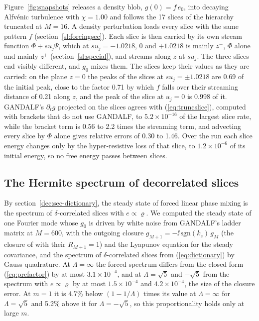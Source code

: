 Figure~\ref{fig:snapshots} releases a density blob, $g(0)=f\,e_0$, into decaying Alfv\'enic turbulence with $\chi=1.00$ and follows the 17 slices of the hierarchy truncated at $M=16$. A density perturbation loads every slice with the same pattern $f$ (section~\ref{sl:forcingsec}). Each slice is then carried by its own stream function $\Phi+su_j\Psi$, which at $su_j=-1.0218$, $0$ and $+1.0218$ is mainly $z^-$, $\Phi$ alone and mainly $z^+$ (section~\ref{sl:special}), and streams along $z$ at $su_j$. The three slices end visibly different, and $g_0$ mixes them. The slices keep their values as they are carried: on the plane $z=0$ the peaks of the slices at $su_j=\pm1.0218$ are 0.69 of the initial peak, close to the factor 0.71 by which $f$ falls over their streaming distance of 0.21 along $z$, and the peak of the slice at $u_j=0$ is 0.998 of it. GANDALF's $\partial_tg$ projected on the slices agrees with (\ref{eq:truncslice}), computed with brackets that do not use GANDALF, to $5.2\times10^{-16}$ of the largest slice rate, while the bracket term is 0.56 to 2.2 times the streaming term, and advecting every slice by $\Phi$ alone gives relative errors of 0.30 to 1.46. Over the run each slice energy changes only by the hyper-resistive loss of that slice, to $1.2\times10^{-6}$ of its initial energy, so no free energy passes between slices.

\subsection{The Hermite spectrum of decorrelated slices}\label{num:dictionary}

By section~\ref{dec:sec-dictionary}, the steady state of forced linear phase mixing is the spectrum of $\delta$-correlated slices with $e\propto\varrho$. We computed the steady state of one Fourier mode whose $g_0$ is driven by white noise from GANDALF's ladder matrix at $M=600$, with the outgoing closure $g_{M+1}=-\ii\,\mathrm{sgn}(k_z)\,g_M$ (the closure of \citealt[eq.~4.36]{Kanekar2015} with their $R_{M+1}=1$) and the Lyapunov equation for the steady covariance, and the spectrum of $\delta$-correlated slices from (\ref{eq:dictionary}) by Gauss quadrature. At $\Lambda=\infty$ the forced spectrum differs from the closed form (\ref{eq:prefactor}) by at most $3.1\times10^{-4}$, and at $\Lambda=\sqrt5$ and $-\sqrt5$ from the spectrum with $e\propto\varrho$ by at most $1.5\times10^{-4}$ and $4.2\times10^{-4}$, the size of the closure error. At $m=1$ it is 4.7\% below $(1-1/\Lambda)$ times its value at $\Lambda=\infty$ for $\Lambda=\sqrt5$ and 5.2\% above it for $\Lambda=-\sqrt5$, so this proportionality holds only at large $m$.

